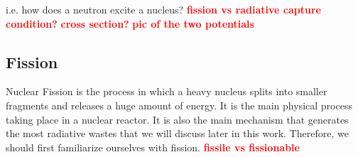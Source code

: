 \documentclass[preprint,aip,cha]{revtex4-1}
\newcommand{\red}[1]{\textcolor{red}{\bf #1}}
\begin{document}
        i.e. how does a neutron excite a nucleus?
        \red{fission vs radiative capture condition?}
        \red{cross section?}
        \red{pic of the two potentials}

    \subsection{Fission}
    \label{sec:fission}
        Nuclear Fission is the process in which a heavy nucleus splits into smaller fragments and releases
        a huge amount of energy. It is the main physical process taking place in a nuclear reactor. It is
        also the main mechanism that generates the most radiative wastes that we will discuss later
        in this work. Therefore, we should first familiarize ourselves with fission.
        \red{fissile vs fissionable}
\end{document}
